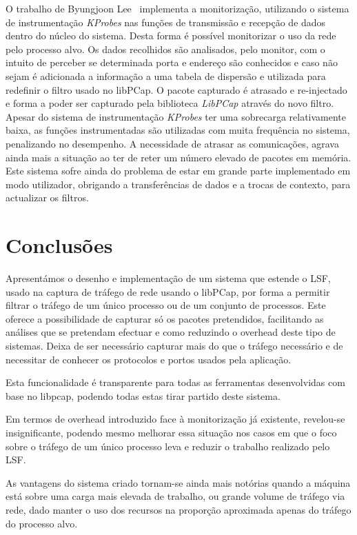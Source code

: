 \documentclass[a4paper]{llncs}
\begin{document}
O trabalho de Byungjoon Lee~\cite{1688981} implementa a monitorização, utilizando o sistema de instrumentação \textit{KProbes} nas funções de transmissão e recepção de dados dentro do núcleo do sistema. Desta forma é possível monitorizar o uso da rede pelo processo alvo. Os dados recolhidos são analisados, pelo monitor, com o intuito de perceber se determinada porta e endereço são conhecidos e caso não sejam é adicionada a informação a uma tabela de dispersão e utilizada para redefinir o filtro usado no libPCap. O pacote capturado  é atrasado e re-injectado e forma a poder ser capturado pela biblioteca \textit{LibPCap} através do novo filtro.
Apesar do sistema de instrumentação \textit{KProbes} ter uma sobrecarga relativamente baixa, as funções instrumentadas são utilizadas com muita frequência no sistema, penalizando no desempenho. A necessidade de atrasar as comunicações, agrava ainda mais a situação ao ter de reter um número elevado de pacotes em memória. Este sistema sofre ainda do problema de estar em grande parte implementado em modo utilizador, obrigando a transferências de dados e a trocas de contexto, para actualizar os filtros.



\section{Conclusões}
\label{sec:conclusions}

Apresentámos o desenho e implementação de um sistema que estende o LSF, usado na captura de tráfego de rede usando o libPCap, por forma a permitir filtrar o tráfego de um único processo ou de um conjunto de processos. Este oferece a possibilidade de capturar só os pacotes pretendidos, facilitando as análises que se pretendam efectuar e como reduzindo o overhead deste tipo de sistemas. Deixa de ser necessário capturar mais do que o tráfego necessário e de necessitar de conhecer os protocolos e portos usados pela aplicação.

Esta funcionalidade é transparente para todas as ferramentas desenvolvidas com base no libpcap, podendo todas estas tirar partido deste sistema.

Em termos de overhead introduzido face à monitorização já existente, revelou-se insignificante, podendo mesmo melhorar essa situação nos casos em que o foco sobre o tráfego de um único processo leva e reduzir o trabalho realizado pelo LSF.

As vantagens do sistema criado tornam-se ainda mais notórias quando a máquina está sobre uma carga mais elevada de trabalho, ou grande volume de tráfego via rede, dado manter o uso dos recursos na proporção aproximada apenas do tráfego do processo alvo.
\end{document}
